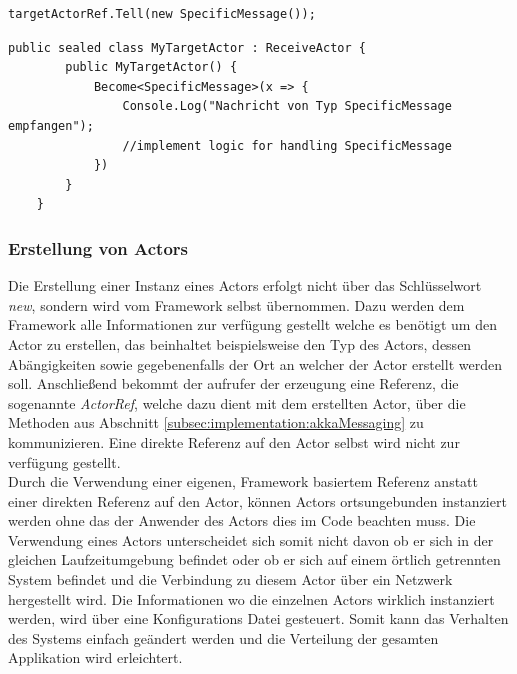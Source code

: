 \begin{lstlisting}[caption=Versenden einer Nachricht an einen anderen Actor, label=code:actor:TellMethod]
    targetActorRef.Tell(new SpecificMessage());
\end{lstlisting}

\begin{lstlisting}[caption=Hier wird für den Actor \textit{MyTargetActor} das Verhalten für eine Einkommende Nachricht vom Typ \textit{SpecificMessage} festgellegt., label=lst:test]
    public sealed class MyTargetActor : ReceiveActor {
        public MyTargetActor() {
            Become<SpecificMessage>(x => {
                Console.Log("Nachricht von Typ SpecificMessage empfangen");
                //implement logic for handling SpecificMessage
            })
        }
    }    
\end{lstlisting}

\subsubsection{Erstellung von Actors}
Die Erstellung einer Instanz eines Actors erfolgt nicht über das Schlüsselwort \textit{new}, sondern wird vom Framework selbst übernommen. Dazu werden dem Framework alle Informationen zur verfügung gestellt welche es benötigt um den Actor zu erstellen, das beinhaltet beispielsweise den Typ des Actors, dessen Abängigkeiten sowie gegebenenfalls der Ort an welcher der Actor erstellt werden soll. Anschließend bekommt der aufrufer der erzeugung eine Referenz, die sogenannte \textit{ActorRef}, welche dazu dient mit dem erstellten Actor, über die Methoden aus Abschnitt \ref{subsec:implementation:akkaMessaging} zu kommunizieren. Eine direkte Referenz auf den Actor selbst wird nicht zur verfügung gestellt. \\
Durch die Verwendung einer eigenen, Framework basiertem Referenz anstatt einer direkten Referenz auf den Actor, können Actors ortsungebunden instanziert werden ohne das der Anwender des Actors dies im Code beachten muss. Die Verwendung eines Actors unterscheidet sich somit nicht davon ob er sich in der gleichen Laufzeitumgebung befindet oder ob er sich auf einem örtlich getrennten System befindet und die Verbindung zu diesem Actor über ein Netzwerk hergestellt wird. Die Informationen wo die einzelnen Actors wirklich instanziert werden, wird über eine Konfigurations Datei gesteuert. Somit kann das Verhalten des Systems einfach geändert werden und die Verteilung der gesamten Applikation wird erleichtert.

